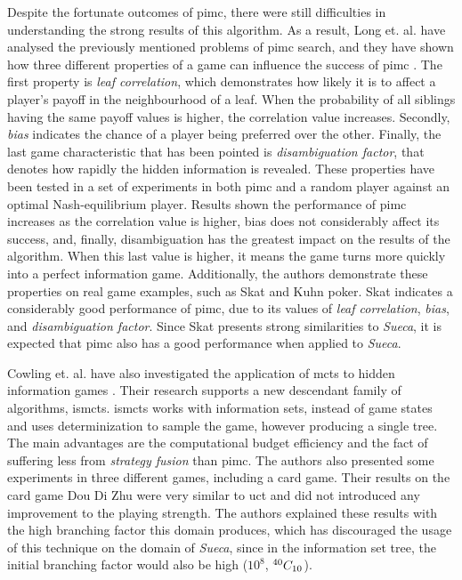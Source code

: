 Despite the fortunate outcomes of \gls{pimc}, there were still difficulties in understanding the strong results of this algorithm.
As a result, Long et. al. have analysed the previously mentioned problems of \gls{pimc} search, and they have shown how three different properties of a game can influence the success of \gls{pimc} \cite{Long2010}.
The first property is \emph{leaf correlation}, which demonstrates how likely it is to affect a player's payoff in the neighbourhood of a leaf.
When the probability of all siblings having the same payoff values is higher, the correlation value increases.
Secondly, \emph{bias} indicates the chance of a player being preferred over the other.
Finally, the last game characteristic that has been pointed is \emph{disambiguation factor}, that denotes how rapidly the hidden information is revealed.
These properties have been tested in a set of experiments in both \gls{pimc} and a random player against an optimal Nash-equilibrium player.
Results shown the performance of \gls{pimc} increases as the correlation value is higher, bias does not considerably affect its success, and, finally, disambiguation has the greatest impact on the results of the algorithm.
When this last value is higher, it means the game turns more quickly into a perfect information game.
Additionally, the authors demonstrate these properties on real game examples, such as Skat and Kuhn poker.
Skat indicates a considerably good performance of \gls{pimc}, due to its values of \emph{leaf correlation}, \emph{bias}, and \emph{disambiguation factor}.
Since Skat presents strong similarities to \emph{Sueca}, it is expected that \gls{pimc} also has a good performance when applied to \emph{Sueca}.


Cowling et. al. have also investigated the application of \gls{mcts} to hidden information games \cite{Cowling2012}.
Their research supports a new descendant family of algorithms, \gls{ismcts}.
\gls{ismcts} works with information sets, instead of game states and uses determinization to sample the game, however producing a single tree.
The main advantages are the computational budget efficiency and the fact of suffering less from \emph{strategy fusion} than \gls{pimc}.
The authors also presented some experiments in three different games, including a card game.
Their results on the card game Dou Di Zhu were very similar to \gls{uct} and did not introduced any improvement to the playing strength.
The authors explained these results with the high branching factor this domain produces, which has discouraged the usage of this technique on the domain of \emph{Sueca}, since in the information set tree, the initial branching factor would also be high ($10^{8}$, ${}^{40}C_{10}$).



